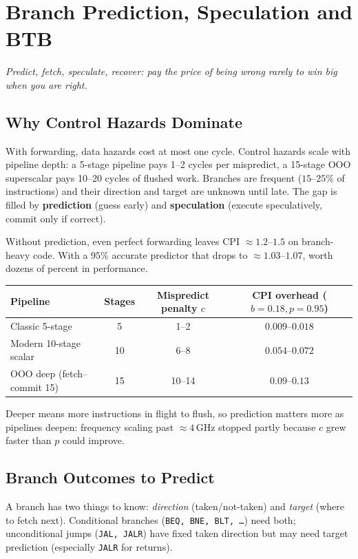 \chapter{Branch Prediction, Speculation and BTB}\label{ch:branch}
\begin{center}\small\textit{Predict, fetch, speculate, recover: pay the price of being wrong rarely to win big when you are right.}\end{center}

\section{Why Control Hazards Dominate}
With forwarding, data hazards cost at most one cycle. Control hazards scale with pipeline depth: a 5-stage pipeline pays 1--2 cycles per mispredict, a 15-stage OOO superscalar pays 10--20 cycles of flushed work. Branches are frequent ($15$--$25\%$ of instructions) and their direction and target are unknown until late. The gap is filled by \textbf{prediction} (guess early) and \textbf{speculation} (execute speculatively, commit only if correct).

Without prediction, even perfect forwarding leaves CPI $\approx 1.2$--$1.5$ on branch-heavy code. With a $95\%$ accurate predictor that drops to $\approx1.03$--$1.07$, worth dozens of percent in performance.

\begin{center}
\begin{tabular}{lccc}
\toprule Pipeline & Stages & Mispredict penalty $c$ & CPI overhead ($b=0.18, p=0.95$) \\ \midrule
Classic 5-stage & 5 & 1--2 & $0.009$--$0.018$ \\
Modern 10-stage scalar & 10 & 6--8 & $0.054$--$0.072$ \\
OOO deep (fetch--commit 15) & 15 & 10--14 & $0.09$--$0.13$ \\ \bottomrule
\end{tabular}
\end{center}
Deeper means more instructions in flight to flush, so prediction matters more as pipelines deepen: frequency scaling past $\approx 4$\,GHz stopped partly because $c$ grew faster than $p$ could improve.

\section{Branch Outcomes to Predict}
A branch has two things to know: \textit{direction} (taken/not-taken) and \textit{target} (where to fetch next). Conditional branches (\texttt{BEQ, BNE, BLT, \dots}) need both; unconditional jumps (\texttt{JAL, JALR}) have fixed taken direction but may need target prediction (especially \texttt{JALR} for returns).

